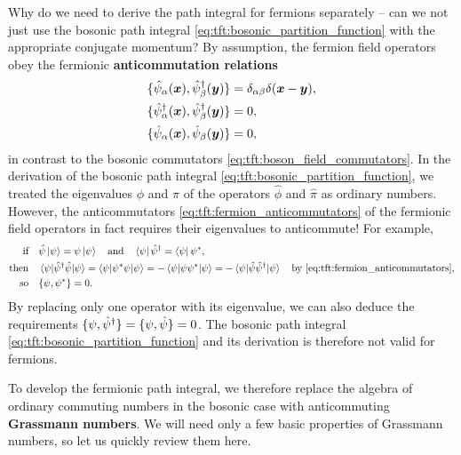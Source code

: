 Why do we need to derive the path integral for fermions separately -- can we not just use the bosonic path integral \eqref{eq:tft:bosonic_partition_function} with the appropriate conjugate momentum?
By assumption, the fermion field operators obey the fermionic \textbf{anticommutation relations}
\begin{subequations}%
\begin{align}%
	\acomm{\destr_\alpha(\vec{x})}{\creat_\beta(\vec{y})} &= \delta_{\alpha \beta} \delta(\vec{x}-\vec{y}) , \\
	\acomm{\creat_\alpha(\vec{x})}{\creat_\beta(\vec{y})} &= 0 , \\
	\acomm{\destr_\alpha(\vec{x})}{\destr_\beta(\vec{y})} &= 0 ,
\end{align}%
\label{eq:tft:fermion_anticommutators}%
\end{subequations}%
in contrast to the bosonic commutators \eqref{eq:tft:boson_field_commutators}.
In the derivation of the bosonic path integral \eqref{eq:tft:bosonic_partition_function}, we treated the eigenvalues $\phi$ and $\pi$ of the operators $\hat\phi$ and $\hat\pi$ as ordinary numbers.
However, the anticommutators \eqref{eq:tft:fermion_anticommutators} of the fermionic field operators in fact requires their eigenvalues to anticommute!
For example,
\begin{equation}
\begin{split}
	\text{if}   \quad & \hat\psi \ket{\psi} = \psi \ket{\psi} \quad \text{and} \quad \bra{\psi} \hat\psi^\dagger = \bra{\psi} {\psi}^* , \\
	\text{then} \quad & \braket{\psi | \hat\psi^\dagger \hat\psi | \psi} = \braket{\psi | {\psi}^* \psi | \psi} = -\braket{\psi | \psi {\psi}^* | \psi} = -\braket{\psi | \hat\psi \hat\psi^\dagger | \psi} \quad \text{by \eqref{eq:tft:fermion_anticommutators}}, \\
	\text{so}   \quad & \{ \psi , {\psi}^* \} = 0 . \\
\end{split}
\label{eq:tft:eigenvalues_must_anticommute}
\end{equation}
By replacing only one operator with its eigenvalue, we can also deduce the requirements $\{ \psi , \hat\psi^\dagger \} = \{ \psi , \hat\psi \} = 0$.
The bosonic path integral \eqref{eq:tft:bosonic_partition_function} and its derivation is therefore not valid for fermions.

To develop the fermionic path integral, we therefore replace the algebra of ordinary commuting numbers in the bosonic case with anticommuting \textbf{Grassmann numbers}.
We will need only a few basic properties of Grassmann numbers, so let us quickly review them here.

